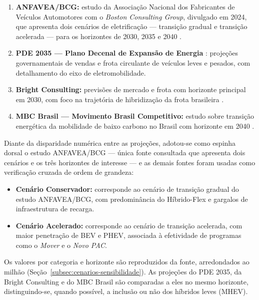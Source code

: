 \begin{enumerate}
    \item \textbf{ANFAVEA/BCG:} estudo da Associação Nacional dos Fabricantes de
    Veículos Automotores com o \textit{Boston Consulting Group}, divulgado em
    2024, que apresenta dois cenários de eletrificação — transição gradual e
    transição acelerada — para os horizontes de 2030, 2035 e 2040
    \cite{anfaveabcg2024}.

    \item \textbf{PDE 2035 — Plano Decenal de Expansão de Energia}
    \cite{EPE2025}: projeções governamentais de vendas e frota circulante de
    veículos leves e pesados, com detalhamento do eixo de eletromobilidade.

    \item \textbf{Bright Consulting:} previsões de mercado e frota com horizonte
    principal em 2030, com foco na trajetória de hibridização da frota brasileira
    \cite{BrightConsulting}.

    \item \textbf{MBC Brasil — Movimento Brasil Competitivo:} estudo sobre
    transição energética da mobilidade de baixo carbono no Brasil com horizonte em
    2040 \cite{MBCBrasil}.
\end{enumerate}

Diante da disparidade numérica entre as projeções, adotou-se como espinha
dorsal o estudo ANFAVEA/BCG — única fonte consultada que apresenta dois cenários
e os três horizontes de interesse — e as demais fontes foram usadas como
verificação cruzada de ordem de grandeza:

\begin{itemize}
    \item \textbf{Cenário Conservador:} corresponde ao cenário de transição gradual
    do estudo ANFAVEA/BCG, com predominância do Híbrido-Flex e gargalos de
    infraestrutura de recarga.

    \item \textbf{Cenário Acelerado:} corresponde ao cenário de transição
    acelerada, com maior penetração de BEV e PHEV, associada à efetividade de
    programas como o \textit{Mover} e o \textit{Novo PAC}.
\end{itemize}

Os valores por categoria e horizonte são reproduzidos da fonte, arredondados ao
milhão (Seção~\ref{subsec:cenarios-sensibilidade}). As projeções do PDE 2035, da
Bright Consulting e do MBC Brasil são comparadas a eles no mesmo horizonte,
distinguindo-se, quando possível, a inclusão ou não dos híbridos leves (MHEV).

